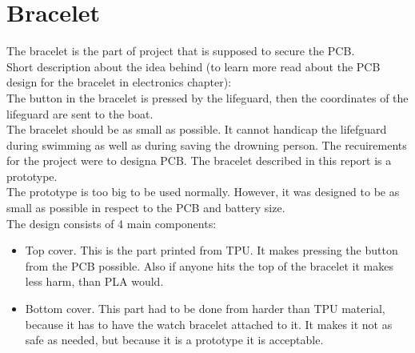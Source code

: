 \section{Bracelet}
The bracelet is the part of project that is supposed to secure the PCB.\\
Short description about the idea behind (to learn more read about the PCB design for the bracelet in electronics chapter):\\
The button in the bracelet is pressed by the lifeguard, then the coordinates of the lifeguard are sent to the boat.\\
The bracelet should be as small as possible. It cannot handicap the lifefguard during swimming as well as during saving the drowning person.
The recuirements for the project were to designa PCB. The bracelet described in this report is a prototype.\\
The prototype is too big to be used normally. However, it was designed to be as small as possible in respect to the PCB and battery size.\\
The design consists of 4 main components:\\
\begin{itemize}
    \item Top cover. This is the part printed from TPU. It makes pressing the button from the PCB possible. Also if anyone hits the top
    of the bracelet it makes less harm, than PLA would. 
    \item Bottom cover. This part had to be done from harder than TPU material, because it has to have the watch bracelet attached to it.
    It makes it not as safe as needed, but because it is a prototype it is acceptable.
\end{itemize}